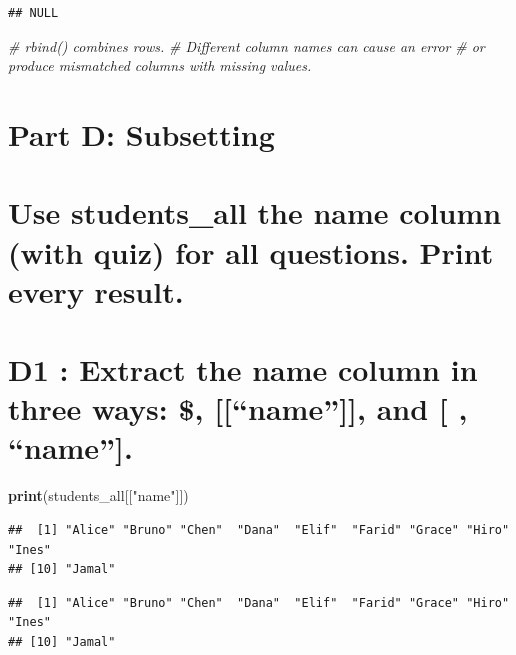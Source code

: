 \documentclass[
]{article}
\newenvironment{Shaded}{\begin{snugshade}}{\end{snugshade}}
\newcommand{\CommentTok}[1]{\textcolor[rgb]{0.56,0.35,0.01}{\textit{#1}}}
\newcommand{\FunctionTok}[1]{\textcolor[rgb]{0.13,0.29,0.53}{\textbf{#1}}}
\newcommand{\NormalTok}[1]{#1}
\newcommand{\SpecialCharTok}[1]{\textcolor[rgb]{0.81,0.36,0.00}{\textbf{#1}}}
\newcommand{\StringTok}[1]{\textcolor[rgb]{0.31,0.60,0.02}{#1}}
\begin{document}
\begin{verbatim}
## NULL
\end{verbatim}

\begin{Shaded}
\begin{Highlighting}[]
\CommentTok{\# rbind() combines rows.}
\CommentTok{\# Different column names can cause an error}
\CommentTok{\# or produce mismatched columns with missing values.}
\end{Highlighting}
\end{Shaded}

\section{Part D: Subsetting}\label{part-d-subsetting}

\section{Use students\_all the name column (with quiz) for all
questions. Print every
result.}\label{use-students_all-the-name-column-with-quiz-for-all-questions.-print-every-result.}

\section{D1 : Extract the name column in three ways: \$,
{[}{[}``name''{]}{]}, and {[} ,
``name''{]}.}\label{d1-extract-the-name-column-in-three-ways-name-and-name.}

\begin{Shaded}
\begin{Highlighting}[]
\FunctionTok{print}\NormalTok{(students\_all[[}\StringTok{"name"}\NormalTok{]])}
\end{Highlighting}
\end{Shaded}

\begin{verbatim}
##  [1] "Alice" "Bruno" "Chen"  "Dana"  "Elif"  "Farid" "Grace" "Hiro"  "Ines" 
## [10] "Jamal"
\end{verbatim}

\begin{Shaded}
\end{Shaded}

\begin{verbatim}
##  [1] "Alice" "Bruno" "Chen"  "Dana"  "Elif"  "Farid" "Grace" "Hiro"  "Ines" 
## [10] "Jamal"
\end{verbatim}
\end{document}
